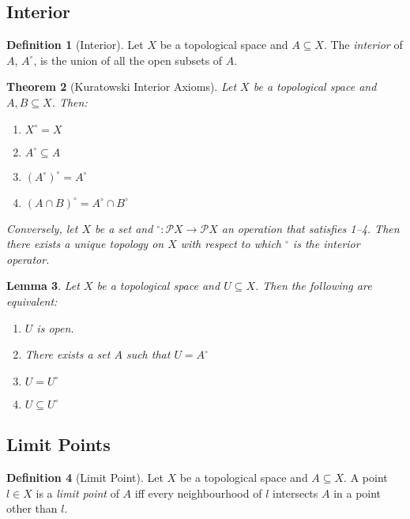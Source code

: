 \documentclass{book}
\newtheorem{lm}{Lemma}[chapter]
\newtheorem{thm}[lm]{Theorem}
\theoremstyle{definition}
\newtheorem{df}[lm]{Definition}
\begin{document}
  \subsection{Interior}
  
  \begin{df}[Interior]
    Let $X$ be a topological space and $A \subseteq X$. The \emph{interior} of 
    $A$, $A^\circ$, is the union of all the open subsets of $A$.
  \end{df}
  
  \begin{thm}[Kuratowski Interior Axioms]
    Let $X$ be a topological space and $A, B \subseteq X$. Then:
    \begin{enumerate}
      \item $X^\circ = X$
      \item $A^\circ \subseteq A$
      \item $(A^\circ)^\circ = A^\circ$
      \item $(A \cap B)^\circ = A^\circ \cap B^\circ$
    \end{enumerate}
    
    Conversely, let $X$ be a set and $^\circ : \mathcal{P} X \rightarrow 
    \mathcal{P} X$ an operation that satisfies 1--4. Then there exists a unique
    topology on $X$ with respect to which $^\circ$ is the interior operator.
  \end{thm}
  
  \begin{lm}
    Let $X$ be a topological space and $U \subseteq X$. Then the following are 
    equivalent:
    \begin{enumerate}
      \item $U$ is open.
      \item There exists a set $A$ such that $U = A^\circ$
      \item $U = U^\circ$
      \item $U \subseteq U^\circ$
    \end{enumerate}
  \end{lm}
  
  \subsection{Limit Points}
  
  \begin{df}[Limit Point]
    Let $X$ be a topological space and $A \subseteq X$. A point $l \in X$ is a 
    \emph{limit point} of $A$ iff every neighbourhood of $l$ intersects $A$ in 
    a 
    point other than $l$.
  \end{df}
  
\end{document}
